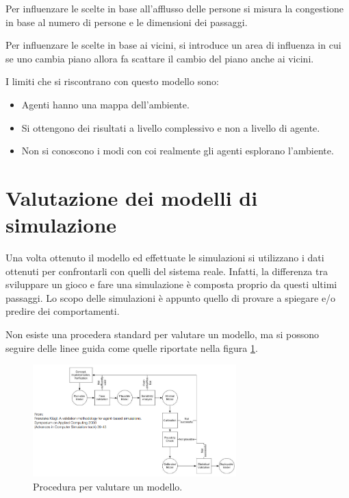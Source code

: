 Per influenzare le scelte in base all'afflusso delle persone si misura la congestione
in base al numero di persone e le dimensioni dei passaggi.

Per influenzare le scelte in base ai vicini, si introduce un area di influenza
in cui se uno cambia piano allora fa scattare il cambio del piano anche ai vicini.

I limiti che si riscontrano con questo modello sono:
\begin{itemize}
    \item Agenti hanno una mappa dell'ambiente.
    \item Si ottengono dei risultati a livello complessivo e non a livello di agente.
    \item Non si conoscono i modi con coi realmente gli agenti esplorano l'ambiente.
\end{itemize}
\section{Valutazione dei modelli di simulazione}
Una volta ottenuto il modello ed effettuate le simulazioni si utilizzano i dati
ottenuti per confrontarli con quelli del sistema reale. Infatti, la differenza
tra sviluppare un gioco e fare una simulazione è composta proprio da questi
ultimi passaggi. Lo scopo delle simulazioni è appunto quello di provare a spiegare
e/o predire dei comportamenti.

Non esiste una procedera standard per valutare un modello, ma si possono seguire
delle linee guida come quelle riportate nella figura \ref{fig:valutazione_modello}.
\begin{figure}[!ht]
    \centering
    \includegraphics[width=0.7\textwidth]{./img/modelli/valutazione_modello.png}
    \caption{Procedura per valutare un modello.}
    \label{fig:valutazione_modello}
\end{figure}


